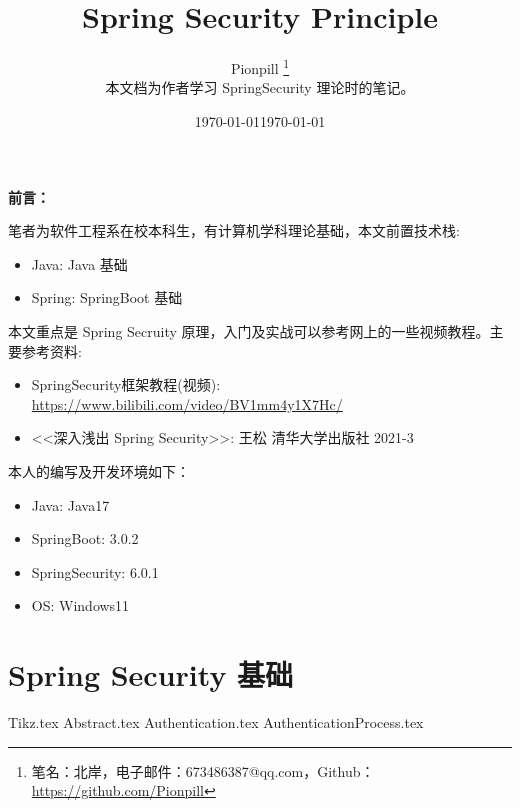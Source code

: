\documentclass{PionpillNote-book}
\title{Spring Security Principle}
\author{
    Pionpill \footnote{笔名：北岸，电子邮件：673486387@qq.com，Github：\url{https://github.com/Pionpill}} \\
    本文档为作者学习 SpringSecurity 理论时的笔记。\\
}
\date{\today}
\begin{document}
\pagestyle{plain}
\maketitle

\noindent\textbf{前言：}

笔者为软件工程系在校本科生，有计算机学科理论基础，本文前置技术栈:
\begin{itemize}
    \item Java: Java 基础
    \item Spring: SpringBoot 基础
\end{itemize}

本文重点是 Spring Secruity 原理，入门及实战可以参考网上的一些视频教程。主要参考资料:
\begin{itemize}
    \item SpringSecurity框架教程(视频): \url{https://www.bilibili.com/video/BV1mm4y1X7Hc/}
    \item <<深入浅出 Spring Security>>: 王松 清华大学出版社 2021-3
\end{itemize}

本人的编写及开发环境如下：
\begin{itemize}
    \item Java: Java17
    \item SpringBoot: 3.0.2
    \item SpringSecurity: 6.0.1
    \item OS: Windows11
\end{itemize}

\date{\today}
\newpage

\tableofcontents

\newpage

\setcounter{page}{1} 
\pagestyle{fancy}

\chapter{Spring Security 基础}
{Tikz.tex}
{Abstract.tex}
{Authentication.tex}
{AuthenticationProcess.tex}
\end{document}
